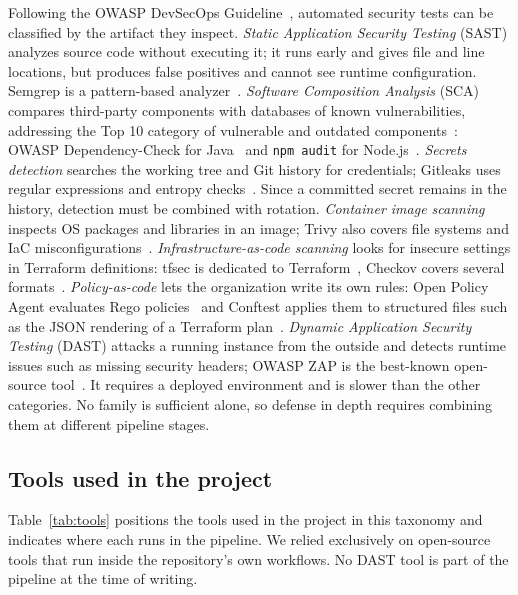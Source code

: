 Following the OWASP DevSecOps Guideline~\cite{owasp-devsecops}, automated security tests can be classified by the artifact they inspect.
\emph{Static Application Security Testing} (SAST) analyzes source code without executing it; it runs early and gives file and line locations, but produces false positives and cannot see runtime configuration. Semgrep is a pattern-based analyzer~\cite{semgrep}.
\emph{Software Composition Analysis} (SCA) compares third-party components with databases of known vulnerabilities, addressing the Top 10 category of vulnerable and outdated components~\cite{owasp-top10}: OWASP Dependency-Check for Java~\cite{dependency-check} and \texttt{npm audit} for Node.js~\cite{npm-audit}.
\emph{Secrets detection} searches the working tree and Git history for credentials; Gitleaks uses regular expressions and entropy checks~\cite{gitleaks}. Since a committed secret remains in the history, detection must be combined with rotation.
\emph{Container image scanning} inspects OS packages and libraries in an image; Trivy also covers file systems and IaC misconfigurations~\cite{trivy}.
\emph{Infrastructure-as-code scanning} looks for insecure settings in Terraform definitions: tfsec is dedicated to Terraform~\cite{tfsec}, Checkov covers several formats~\cite{checkov}. \emph{Policy-as-code} lets the organization write its own rules: Open Policy Agent evaluates Rego policies~\cite{opa} and Conftest applies them to structured files such as the JSON rendering of a Terraform plan~\cite{conftest}.
\emph{Dynamic Application Security Testing} (DAST) attacks a running instance from the outside and detects runtime issues such as missing security headers; OWASP ZAP is the best-known open-source tool~\cite{owasp-zap}. It requires a deployed environment and is slower than the other categories.
No family is sufficient alone, so defense in depth requires combining them at different pipeline stages.

\subsection{Tools used in the project}

Table~\ref{tab:tools} positions the tools used in the project in this taxonomy and indicates where each runs in the pipeline. We relied exclusively on open-source tools that run inside the repository's own workflows. No DAST tool is part of the pipeline at the time of writing.

